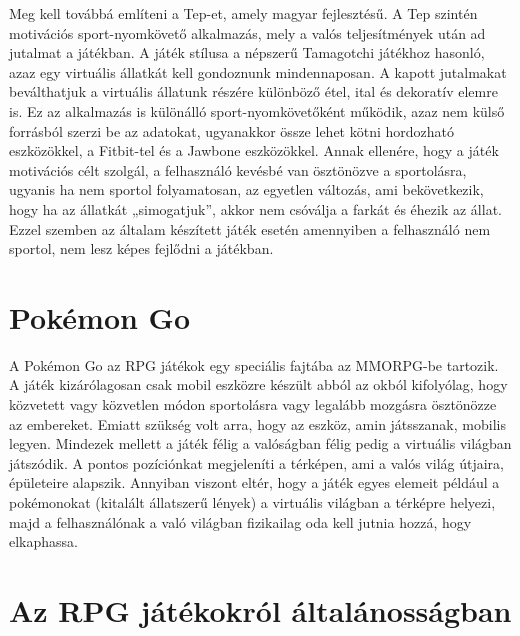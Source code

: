 Meg kell továbbá említeni a Tep-et, amely magyar fejlesztésű. 
A Tep szintén motivációs sport-nyomkövető alkalmazás, mely a valós teljesítmények után ad jutalmat a játékban. 
A játék stílusa a népszerű Tamagotchi játékhoz hasonló, azaz egy virtuális állatkát kell gondoznunk mindennaposan. 
A kapott jutalmakat beválthatjuk a virtuális állatunk részére különböző étel, ital és dekoratív elemre is. 
Ez az alkalmazás is különálló sport-nyomkövetőként működik, azaz nem külső forrásból szerzi be az adatokat, ugyanakkor össze lehet kötni hordozható eszközökkel, a Fitbit-tel és a Jawbone eszközökkel. 
Annak ellenére, hogy a játék motivációs célt szolgál, a felhasználó kevésbé van ösztönözve a sportolásra, ugyanis ha nem sportol folyamatosan, az egyetlen változás, ami bekövetkezik, hogy ha az állatkát „simogatjuk”, akkor nem csóválja a farkát és éhezik az állat. 
Ezzel szemben az általam készített játék esetén amennyiben a felhasználó nem sportol, nem lesz képes fejlődni a játékban. 

\section*{Pokémon Go}
\label{pokemongo}

A Pokémon Go az RPG játékok egy speciális fajtába az MMORPG-be tartozik. 
A játék kizárólagosan csak mobil eszközre készült abból az okból kifolyólag, hogy közvetett vagy közvetlen módon sportolásra vagy legalább mozgásra ösztönözze az embereket. 
Emiatt szükség volt arra, hogy az eszköz, amin játsszanak, mobilis legyen. 
Mindezek mellett a játék félig a valóságban félig pedig a virtuális világban játszódik. 
A pontos pozíciónkat megjeleníti a térképen, ami a valós világ útjaira, épületeire alapszik. 
Annyiban viszont eltér, hogy a játék egyes elemeit például a pokémonokat (kitalált állatszerű lények) a virtuális világban a térképre helyezi, majd a felhasználónak a való világban fizikailag oda kell jutnia hozzá, hogy elkaphassa. 

\section{Az RPG játékokról általánosságban}
\label{rpgaltalanos}

